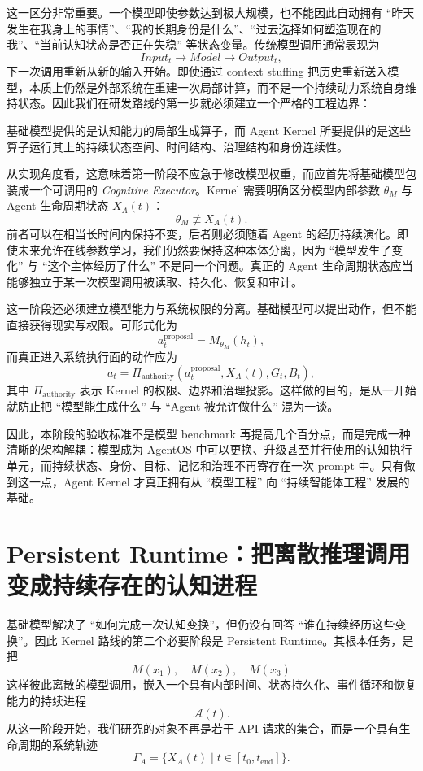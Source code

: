 这一区分非常重要。一个模型即使参数达到极大规模，也不能因此自动拥有 ``昨天发生在我身上的事情''、``我的长期身份是什么''、``过去选择如何塑造现在的我''、``当前认知状态是否正在失稳'' 等状态变量。传统模型调用通常表现为
\[
Input_t \rightarrow Model \rightarrow Output_t,
\]
下一次调用重新从新的输入开始。即使通过 context stuffing 把历史重新送入模型，本质上仍然是外部系统在重建一次局部计算，而不是一个持续动力系统自身维持状态。因此我们在研发路线的第一步就必须建立一个严格的工程边界：
\begin{statementbox}
\centering
{}
\end{statementbox}
基础模型提供的是认知能力的局部生成算子，而 Agent Kernel 所要提供的是这些算子运行其上的持续状态空间、时间结构、治理结构和身份连续性。

从实现角度看，这意味着第一阶段不应急于修改模型权重，而应首先将基础模型包装成一个可调用的 \emph{Cognitive Executor}。Kernel 需要明确区分模型内部参数 $\theta_M$ 与 Agent 生命周期状态 $X_A(t)$：
\[
\theta_M \not\equiv X_A(t).
\]
前者可以在相当长时间内保持不变，后者则必须随着 Agent 的经历持续演化。即使未来允许在线参数学习，我们仍然要保持这种本体分离，因为 ``模型发生了变化'' 与 ``这个主体经历了什么'' 不是同一个问题。真正的 Agent 生命周期状态应当能够独立于某一次模型调用被读取、持久化、恢复和审计。

这一阶段还必须建立模型能力与系统权限的分离。基础模型可以提出动作，但不能直接获得现实写权限。可形式化为
\[
a_t^{\mathrm{proposal}}
=
M_{\theta_M}(h_t),
\]
而真正进入系统执行面的动作应为
\[
a_t
=
\Pi_{\mathrm{authority}}
\left(
a_t^{\mathrm{proposal}},
X_A(t),
G_t,
B_t
\right),
\]
其中 $\Pi_{\mathrm{authority}}$ 表示 Kernel 的权限、边界和治理投影。这样做的目的，是从一开始就防止把 ``模型能生成什么'' 与 ``Agent 被允许做什么'' 混为一谈。

因此，本阶段的验收标准不是模型 benchmark 再提高几个百分点，而是完成一种清晰的架构解耦：模型成为 AgentOS 中可以更换、升级甚至并行使用的认知执行单元，而持续状态、身份、目标、记忆和治理不再寄存在一次 prompt 中。只有做到这一点，Agent Kernel 才真正拥有从 ``模型工程'' 向 ``持续智能体工程'' 发展的基础。

\section{Persistent Runtime：把离散推理调用变成持续存在的认知进程}

基础模型解决了 ``如何完成一次认知变换''，但仍没有回答 ``谁在持续经历这些变换''。因此 Kernel 路线的第二个必要阶段是 Persistent Runtime。其根本任务，是把
\[
M(x_1),\quad M(x_2),\quad M(x_3)
\]
这样彼此离散的模型调用，嵌入一个具有内部时间、状态持久化、事件循环和恢复能力的持续进程
\[
\mathcal A(t).
\]
从这一阶段开始，我们研究的对象不再是若干 API 请求的集合，而是一个具有生命周期的系统轨迹
\[
\Gamma_A
=
\{X_A(t)\mid t\in[t_0,t_{\mathrm{end}}]\}.
\]

